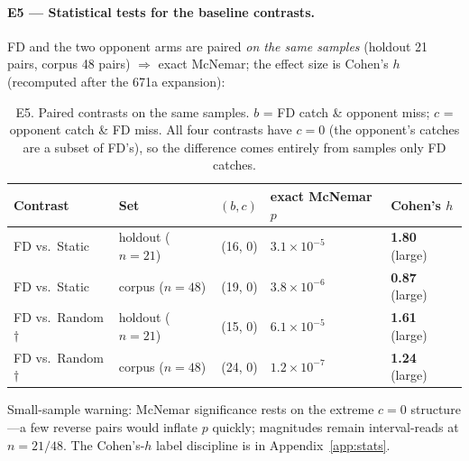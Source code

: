 \documentclass{article}
\begin{document}
\paragraph{E5 --- Statistical tests for the baseline contrasts.}
FD and the two opponent arms are paired \emph{on the same samples} (holdout 21 pairs, corpus 48
pairs) $\Rightarrow$ exact McNemar; the effect size is Cohen's $h$ (recomputed after the 671a
expansion):
\begin{table}[h]
\caption{E5. Paired contrasts on the same samples. $b$ = FD catch \& opponent miss;
$c$ = opponent catch \& FD miss. All four contrasts have $c=0$ (the opponent's catches are a
subset of FD's), so the difference comes entirely from samples only FD catches.}
\label{tab:e5}
\centering
\small
\begin{tabular}{@{}llrll@{}}
\toprule
Contrast & Set & $(b, c)$ & exact McNemar $p$ & Cohen's $h$ \\
\midrule
FD vs.\ Static & holdout ($n{=}21$) & (16, 0) & $3.1\times10^{-5}$ & \textbf{1.80} (large) \\
FD vs.\ Static & corpus ($n{=}48$) & (19, 0) & $3.8\times10^{-6}$ & \textbf{0.87} (large) \\
FD vs.\ Random$\dagger$ & holdout ($n{=}21$) & (15, 0) & $6.1\times10^{-5}$ & \textbf{1.61} (large) \\
FD vs.\ Random$\dagger$ & corpus ($n{=}48$) & (24, 0) & $1.2\times10^{-7}$ & \textbf{1.24} (large) \\
\bottomrule
\end{tabular}
\end{table}
Small-sample warning: McNemar significance rests on the extreme $c{=}0$ structure---a few reverse
pairs would inflate $p$ quickly; magnitudes remain interval-reads at $n=21/48$. The Cohen's-$h$
label discipline is in Appendix~\ref{app:stats}.

\end{document}
